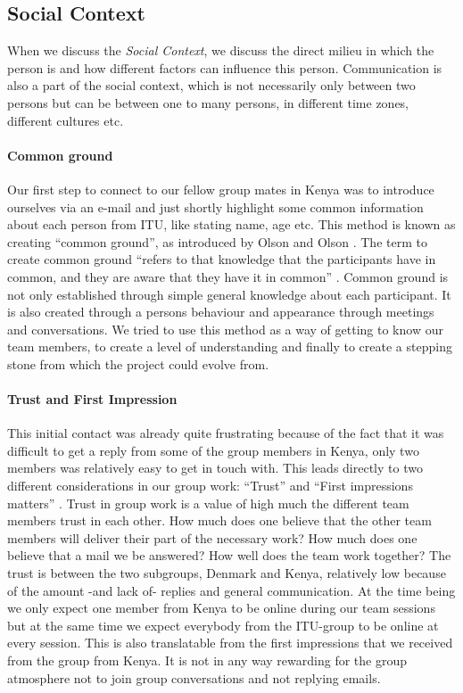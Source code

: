 \subsection{Social Context} \label{subsec:socialcontext}
When we discuss the \textit{Social Context}, we discuss the direct milieu in which the person is and how different factors can influence this person. Communication is also a part of the social context, which is not necessarily only between two persons but can be between one to many persons, in different time zones, different cultures etc.\\
\paragraph{Common ground} \label{par:commonground}
Our first step to connect to our fellow group mates in Kenya was to introduce ourselves via an e-mail and just shortly highlight some common information about each person from ITU, like stating name, age etc. This method is known as creating ``common ground'', as introduced by Olson and Olson \cite{olson:2000:distance}. The term to create common ground ``refers to that knowledge that the participants have in common, and they are aware that they have it in common'' \cite{olson:2000:distance}. Common ground is not only established through simple general knowledge about each participant. It is also created through a persons behaviour and appearance through meetings and conversations. We tried to use this method as a way of getting to know our team members, to create a level of understanding and finally to create a stepping stone from which the project could evolve from.

\paragraph{Trust and First Impression} \label{par:trustandfirstimpressions}
This initial contact was already quite frustrating because of the fact that it was difficult to get a reply from some of the group members in Kenya, only two members was relatively easy to get in touch with. This leads directly to two different considerations in our group work: ``Trust'' and ``First impressions matters'' \cite{jarvenpaa1998communication}. Trust in group work is a value of high much the different team members trust in each other. How much does one believe that the other team members will deliver their part of the necessary work? How much does one believe that a mail we be answered? How well does the team work together? The trust is between the two subgroups, Denmark and Kenya, relatively low because of the amount -and lack of- replies and general communication. At the time being we only expect one member from Kenya to be online during our team sessions but at the same time we expect everybody from the ITU-group to be online at every session. This is also translatable from the first impressions that we received from the group from Kenya. It is not in any way rewarding for the group atmosphere not to join group conversations and not replying emails. 

